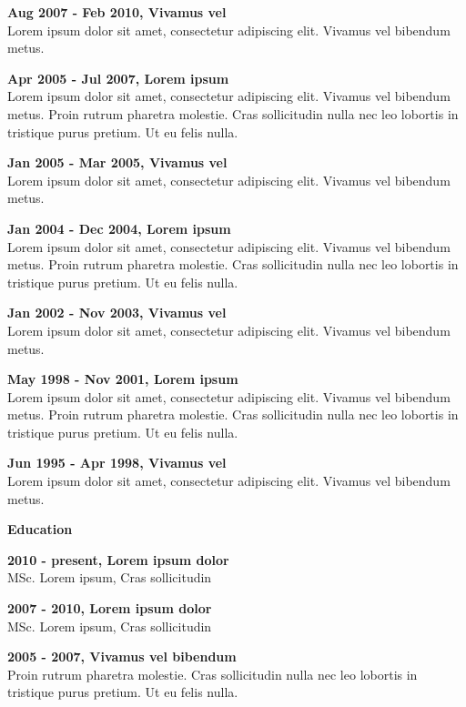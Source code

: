 \documentclass[a4paper,12pt,final]{memoir}
\newcommand{\Sep}{\vspace{1.5em}}
\newcommand{\SmallSep}{\vspace{0.5em}}
\newcommand{\CVSection}[1]
	{\Large\textbf{#1}\par
	\SmallSep\normalsize\normalfont}
\newcommand{\CVItem}[1]
	{\textbf{\color{RoyalBlue} #1}}
\begin{document}
\CVItem{Aug 2007 - Feb 2010, Vivamus vel} \\ 
Lorem ipsum dolor sit amet, consectetur adipiscing elit. Vivamus vel bibendum metus.
\SmallSep

\CVItem{Apr 2005 - Jul 2007, Lorem ipsum} \\ 
Lorem ipsum dolor sit amet, consectetur adipiscing elit. Vivamus vel bibendum metus. Proin rutrum pharetra molestie. Cras sollicitudin nulla nec leo lobortis in tristique purus pretium. Ut eu felis nulla.
\SmallSep

\CVItem{Jan 2005 - Mar 2005, Vivamus vel} \\ 
Lorem ipsum dolor sit amet, consectetur adipiscing elit. Vivamus vel bibendum metus.
\SmallSep

\CVItem{Jan 2004 - Dec 2004, Lorem ipsum} \\ 
Lorem ipsum dolor sit amet, consectetur adipiscing elit. Vivamus vel bibendum metus. Proin rutrum pharetra molestie. Cras sollicitudin nulla nec leo lobortis in tristique purus pretium. Ut eu felis nulla.
\SmallSep

\CVItem{Jan 2002 - Nov 2003, Vivamus vel} \\ 
Lorem ipsum dolor sit amet, consectetur adipiscing elit. Vivamus vel bibendum metus.
\SmallSep

\CVItem{May 1998 - Nov 2001, Lorem ipsum} \\ 
Lorem ipsum dolor sit amet, consectetur adipiscing elit. Vivamus vel bibendum metus. Proin rutrum pharetra molestie. Cras sollicitudin nulla nec leo lobortis in tristique purus pretium. Ut eu felis nulla.
\SmallSep

\CVItem{Jun 1995 - Apr 1998, Vivamus vel} \\ 
Lorem ipsum dolor sit amet, consectetur adipiscing elit. Vivamus vel bibendum metus.

\Sep

\CVSection{Education}
\CVItem{2010 - present, Lorem ipsum dolor} \\ 
MSc. Lorem ipsum, Cras sollicitudin
\SmallSep

\CVItem{2007 - 2010, Lorem ipsum dolor} \\ 
MSc. Lorem ipsum, Cras sollicitudin
\SmallSep

\clearpage
\framebreak
\framebreak

\CVItem{2005 - 2007, Vivamus vel bibendum} \\ 
Proin rutrum pharetra molestie. Cras sollicitudin nulla nec leo lobortis in tristique purus pretium. Ut eu felis nulla.
\Sep
\end{document}

